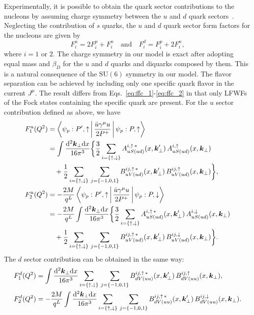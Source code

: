 \documentclass[aps,prc,preprint,groupedaddress,showpacs,superscriptaddress,floatfix]{revtex4-1}
\newcommand{\diff}{\ensuremath\mathrm{d}}
\renewcommand{\vec}[1]{\ensuremath\boldsymbol{#1}}
\newcommand{\udarrow}{\ensuremath{{\uparrow,\downarrow}}}
\begin{document}
Experimentally, it is possible to obtain the quark sector contributions to the nucleons by assuming charge symmetry between the $u$ and $d$ quark sectors~\cite{cates_flavor_2011}.
Neglecting the contribution of $s$ quarks, the $u$ and $d$ quark sector form factors for the nucleons are given by
%
\begin{equation}\label{eq:ff_sector}
F^u_{i} = 2 F^p_i + F^n_i\quad \mathrm{and}\quad F^d_i = F^p_i + 2 F^n_i,
\end{equation}
%
where $i=1$ or $2$.
The charge symmetry in our model is exact after adopting equal mass and $\beta_{D}$ for the $u$ and $d$ quarks and diquarks composed by them.
This is a natural consequence of the $\mathrm{SU}(6)$ symmetry in our model.
The flavor separation can be achieved by including only one specific quark flavor in the current $J^\mu$.
The result differs from Eqs.~\eqref{eq:ffc_1}-\eqref{eq:ffc_2} in that only LFWFs of the Fock states containing the specific quark are present. For the $u$ sector contribution defined as above, we have
%
\begin{align}
  F_1^u(Q^2) &= \Braket{\psi_p: P',\uparrow|\frac{\bar{u}\gamma^\mu u}{2P^+}|\psi_p: P,\uparrow} \nonumber\\
  &= \int\frac{\diff^2\vec{k}_\perp \diff x}{16\pi^3} \biggl\{\frac{3}{2} \sum_{i=\{\udarrow\}}
  A^{i,\uparrow\,*}_{uS(ud)}(x,\vec{k}'_\perp)\,A^{i,\uparrow}_{uS(ud)}(x,\vec{k}_\perp) \nonumber\\
  &\quad + \frac{1}{2} \sum_{i=\{\udarrow\}}\,\sum_{j=\{-1,0,1\}}
  B^{ij,\uparrow\,*}_{uV(ud)}(x,\vec{k}'_\perp)\,B^{ij,\uparrow}_{uV(ud)}(x,\vec{k}_\perp)\biggr\}, \label{eq:fu_1}\\
  F_2^u(Q^2) &= -\frac{2M}{q^L} \Braket{\psi_p: P',\uparrow|\frac{\bar{u}\gamma^\mu u}{2P^+}|\psi_p: P,\downarrow} \nonumber\\
  &= -\frac{2M}{q^L} \int\frac{\diff^2\vec{k}_\perp \diff x}{16\pi^3} \biggl\{\frac{3}{2} \sum_{i=\{\udarrow\}}
  A^{i,\uparrow\,*}_{uS(ud)}(x,\vec{k}'_\perp)\,A^{i,\downarrow}_{uS(ud)}(x,\vec{k}_\perp) \nonumber\\
  &\quad + \frac{1}{2} \sum_{i=\{\udarrow\}}\,\sum_{j=\{-1,0,1\}}
  B^{ij,\uparrow\,*}_{uV(ud)}(x,\vec{k}'_\perp)\,B^{ij,\downarrow}_{uV(ud)}(x,\vec{k}_\perp)\biggr\}. \label{eq:fu_2}
\end{align}
%
The $d$ sector contribution can be obtained in the same way:
%
\begin{align}
  F_1^d(Q^2) &= \int\frac{\diff^2\vec{k}_\perp \diff x}{16\pi^3} \sum_{i=\{\udarrow\}}\,\sum_{j=\{-1,0,1\}}
  B^{ij,\uparrow\,*}_{dV(uu)}(x,\vec{k}'_\perp)\,B^{ij,\uparrow}_{dV(uu)}(x,\vec{k}_\perp), \label{eq:fd_1}\\
  F_2^d(Q^2) &= -\frac{2M}{q^L}\int\frac{\diff^2\vec{k}_\perp \diff x}{16\pi^3} \sum_{i=\{\udarrow\}}\,\sum_{j=\{-1,0,1\}}
  B^{ij,\uparrow\,*}_{dV(uu)}(x,\vec{k}'_\perp)\,B^{ij,\downarrow}_{dV(uu)}(x,\vec{k}_\perp). \label{eq:fd_2}
\end{align}
\end{document}
